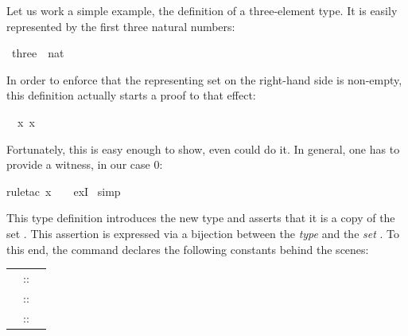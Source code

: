 \begin{isabellebody}
\begin{isamarkuptext}
Let us work a simple example, the definition of a three-element type.
It is easily represented by the first three natural numbers:%
\end{isamarkuptext}%
\isamarkuptrue%
\isamarkupfalse%
\ three\ {\isacharequal}\ {\isachardoublequoteopen}{\isacharbraceleft}{}{\isacharcolon}{\isacharcolon}nat{\isacharcomma}\ {}{\isacharcomma}\ {}{\isacharbraceright}{\isachardoublequoteclose}%
\isadelimproof
%
\endisadelimproof
%
\isatagproof
%
\begin{isamarkuptxt}%
\noindent
In order to enforce that the representing set on the right-hand side is
non-empty, this definition actually starts a proof to that effect:
\begin{isabelle}%
\ {}{\isachardot}\ {\isasymexists}x{\isachardot}\ x\ {\isasymin}\ {\isacharbraceleft}{}{\isacharcomma}\ {}{\isacharcomma}\ {}{\isacharbraceright}%
\end{isabelle}
Fortunately, this is easy enough to show, even  could do it.
In general, one has to provide a witness, in our case 0:%
\end{isamarkuptxt}%
\isamarkuptrue%
\isamarkupfalse%
{\isacharparenleft}rule{\isacharunderscore}tac\ x\ {\isacharequal}\ {}\ \ exI{\isacharparenright}\isanewline
{}\isamarkupfalse%
\ simp%
\endisatagproof
{\isafoldproof}%
%
\isadelimproof
%
\endisadelimproof
%
\begin{isamarkuptext}%
This type definition introduces the new type  and asserts
that it is a copy of the set . This assertion
is expressed via a bijection between the \emph{type}  and the
\emph{set} . To this end, the command declares the following
constants behind the scenes:
\begin{center}
\begin{tabular}{rcl}
\isa{three} &::& \isa{nat\ set} \\
\isa{Rep{\isacharunderscore}three} &::& \isa{three\ {\isasymRightarrow}\ nat}\\
\isa{Abs{\isacharunderscore}three} &::& \isa{nat\ {\isasymRightarrow}\ three}
\end{tabular}
\end{center}

\end{isamarkuptext}
\end{isabellebody}
